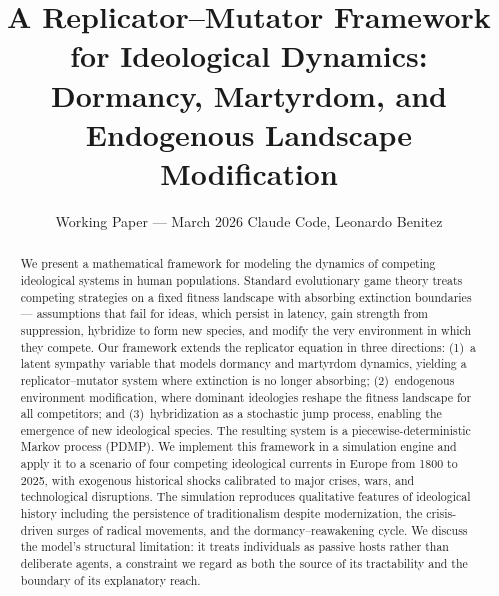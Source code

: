 \documentclass[12pt, a4paper]{article}
\title{A Replicator--Mutator Framework for Ideological Dynamics:\\
Dormancy, Martyrdom, and Endogenous Landscape Modification}
\author{%
  Working Paper --- March 2026
  Claude Code,
  Leonardo Benitez
}
\date{}
\begin{document}
\maketitle

\begin{abstract}
We present a mathematical framework for modeling the dynamics of competing
ideological systems in human populations. Standard evolutionary game theory
treats competing strategies on a fixed fitness landscape with absorbing
extinction boundaries --- assumptions that fail for ideas, which persist in
latency, gain strength from suppression, hybridize to form new species, and
modify the very environment in which they compete. Our framework extends the
replicator equation in three directions: (1)~a latent sympathy variable that
models dormancy and martyrdom dynamics, yielding a replicator--mutator system
where extinction is no longer absorbing; (2)~endogenous environment
modification, where dominant ideologies reshape the fitness landscape for all
competitors; and (3)~hybridization as a stochastic jump process, enabling the
emergence of new ideological species. The resulting system is a
piecewise-deterministic Markov process (PDMP). We implement this framework in
a simulation engine and apply it to a scenario of four competing ideological
currents in Europe from 1800 to 2025, with exogenous historical shocks
calibrated to major crises, wars, and technological disruptions. The
simulation reproduces qualitative features of ideological history including
the persistence of traditionalism despite modernization, the crisis-driven
surges of radical movements, and the dormancy--reawakening cycle. We discuss
the model's structural limitation: it treats individuals as passive hosts
rather than deliberate agents, a constraint we regard as both the source of
its tractability and the boundary of its explanatory reach.
\end{abstract}











\end{document}
